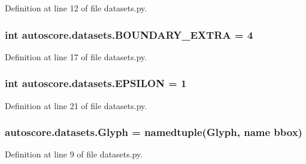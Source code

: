 Definition at line 12 of file datasets.\+py.

\subsubsection[{\texorpdfstring{B\+O\+U\+N\+D\+A\+R\+Y\+\_\+\+E\+X\+T\+RA}{BOUNDARY_EXTRA}}]{\setlength{\rightskip}{0pt plus 5cm}int autoscore.\+datasets.\+B\+O\+U\+N\+D\+A\+R\+Y\+\_\+\+E\+X\+T\+RA = 4}\hypertarget{namespaceautoscore_1_1datasets_ac90c2f8d773dbf3e1371da538b224f3f}{}\label{namespaceautoscore_1_1datasets_ac90c2f8d773dbf3e1371da538b224f3f}


Definition at line 17 of file datasets.\+py.

\subsubsection[{\texorpdfstring{E\+P\+S\+I\+L\+ON}{EPSILON}}]{\setlength{\rightskip}{0pt plus 5cm}int autoscore.\+datasets.\+E\+P\+S\+I\+L\+ON = 1}\hypertarget{namespaceautoscore_1_1datasets_a272e50309d385d448c4fa92b2a0f6042}{}\label{namespaceautoscore_1_1datasets_a272e50309d385d448c4fa92b2a0f6042}


Definition at line 21 of file datasets.\+py.

\subsubsection[{\texorpdfstring{Glyph}{Glyph}}]{\setlength{\rightskip}{0pt plus 5cm}autoscore.\+datasets.\+Glyph = namedtuple(\textquotesingle{}Glyph\textquotesingle{}, \textquotesingle{}name bbox\textquotesingle{})}\hypertarget{namespaceautoscore_1_1datasets_af3fd63b7d9f3cbfbed79fc4a9c6d56eb}{}\label{namespaceautoscore_1_1datasets_af3fd63b7d9f3cbfbed79fc4a9c6d56eb}


Definition at line 9 of file datasets.\+py.

